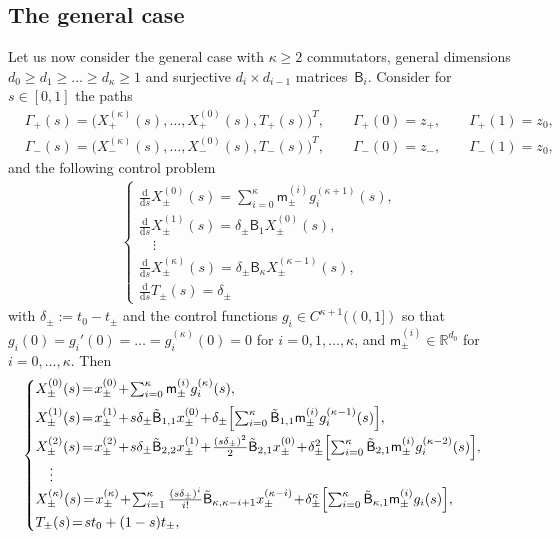 \documentclass[10pt,a4paper]{amsart}
\theoremstyle{definition}
\newcommand\R{{\mathbb R}}
\newcommand{\sB}{{\mathsf B}}
\newcommand\ds{{\frac{\mathrm d}{\mathrm ds}}}
\begin{document}
\subsection{The general case}

Let us now consider the general case with $\kappa \ge 2$
commutators, general dimensions
$d_0 \geq d_1 \geq \dots \geq d_{\kappa}\geq 1$ and surjective
$d_i \times d_{i-1}$ matrices~$\sB_i$. Consider for $s \in [0,1]$
the paths
\begin{equation*}
\begin{aligned}
& \Gamma_+(s) = \bigl(X^{(\kappa)}_+(s), \dots, X^{(0)}_+(s),
T_+(s)\bigr)^T, \qquad \Gamma_+(0) = z_+, \qquad \Gamma_+(1) =
z_0,\\
& \Gamma_-(s) = \bigl(X^{(\kappa)}_-(s), \dots, X^{(0)}_-(s),
T_-(s)\bigr)^T, \qquad \Gamma_-(0) = z_-, \qquad \Gamma_-(1) =
z_0,
\end{aligned}
\end{equation*}
and the following control problem
\begin{equation}
\label{eq:control-general}
\begin{aligned}
\begin{cases}
\ds X^{(0)}_{\pm}(s)
= \sum_{i=0} ^\kappa
\mathsf m_\pm ^{(i)} g_i^{(\kappa+1)} (s), \\[5pt]
\ds X^{(1)}_\pm(s) = \delta_\pm \sB_1 X^{(0)}_\pm(s),\\
\quad \vdots \\
\ds X^{(\kappa)}_\pm(s) = \delta_\pm \sB_\kappa X^{(\kappa-1)}_\pm(s), \\[5pt]
\ds T_\pm(s) = \delta_\pm
\end{cases}
\end{aligned}
\end{equation}
with $\delta_\pm := t_0 - t_\pm$ and the control functions
$g_i \in C^{\kappa +1}((0,1])$ so that
$g_i(0)=g_i'(0)= \dots =g_i^{(\kappa)}(0)=0$ for
$i=0,1,\dots,\kappa$, and $\mathsf m^{(i)} _\pm \in \R^{d_0}$ for
$i=0,\dots,\kappa$. Then
\begin{equation}
\label{eq:control-solved-general}
\begin{cases}
X^{(0)}_{\pm}(s) \!=\! x^{(0)} _\pm \!+\! \sum_{i=0} ^\kappa
\mathsf m_\pm ^{(i)}
g_i^{(\kappa)}(s), \\[5pt]
X^{(1)}_\pm(s) \!=\! x^{(1)} _\pm  \!+\! s \delta_\pm \tilde \sB_{1,1} x^{(0)} _\pm  \!+\!
\delta_\pm \Bigl[ \sum_{i=0} ^\kappa \tilde \sB_{1,1} \mathsf
m_\pm ^{(i)} g_i^{(\kappa-1)} (s) \Bigr],\\[5pt]
X^{(2)}_\pm(s) \!=\! x^{(2)} _\pm  \!+\! s \delta_\pm \tilde
\sB_{2,2} x^{(1)} _\pm  \!+\!
\frac{(s\delta_\pm)^2}{2} \tilde \sB_{2,1} x^{(0)} _\pm \!+\!
\delta_\pm ^2 \Bigl[ \sum_{i=0} ^\kappa \tilde \sB_{2,1} \mathsf m_\pm
^{(i)} g_i^{(\kappa-2)}(s) \Bigr],\\
\quad \vdots \\
X^{(\kappa)}_\pm(s) \!=\! x_\pm ^{(\kappa)}  \!+\! \sum_{i=1} ^\kappa \frac{(s
\delta_\pm)^i}{i!} \tilde \sB_{\kappa,\kappa-i+1} x^{(\kappa-i)} _\pm \!+\! \delta_\pm
^\kappa \Bigl[ \sum_{i=0} ^\kappa \tilde \sB_{\kappa,1} \mathsf
m_\pm ^{(i)} g_i (s) \Bigr],\\
T_\pm(s) \!=\! s t_0 + (1-s) t_\pm,
\end{cases}
\end{equation}
\end{document}
